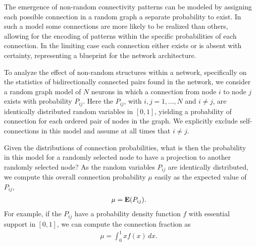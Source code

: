 






The emergence of non-random connectivity patterns can be modeled by
assigning each possible connection in a random graph a separate
probability to exist.
%
In such a model some connections are more likely to be realized than
others, allowing for the encoding of patterns within the specific
probabilities of each connection.
%
In the limiting case each connection either exists or is absent with
certainty, representing a blueprint for the network architecture.
%

%
To analyze the effect of non-random structures within a network,
specifically on the statistics of bidirectionally connected pairs
found in the network, we consider a random graph model of $N$ neurons
in which a connection from node $i$ to node $j$ exists with
probability $P_{ij}$.
%
Here the $P_{ij}$, with $i,j = 1,\dots,N$ and $i \neq j$, are identically
distributed random variables in $[0,1]$, yielding a probability of
connection for each ordered pair of nodes in the graph. We explicitly exclude self-connections in this model and assume at all times that $i \neq j$.%
%

%
Given the distributions of connection probabilities, what is
then the probability in this model for a randomly selected node to have a
projection to another randomly selected node?
%
As the random variables $P_{ij}$ are identically distributed, we
compute this overall connection probability $\mu$ easily as the
expected value of~$P_{ij}$,
\begin{align}
\mu = \operatorname{\mathbf{E}}(P_{ij}).
\end{align}
%
For example, if the $P_{ij}$ have a probability density function $f$ with essential support in $[0,1]$, we can compute the connection fraction as
\begin{align}
  \mu = \int_0^1 x f(x)\,dx.
\end{align}

